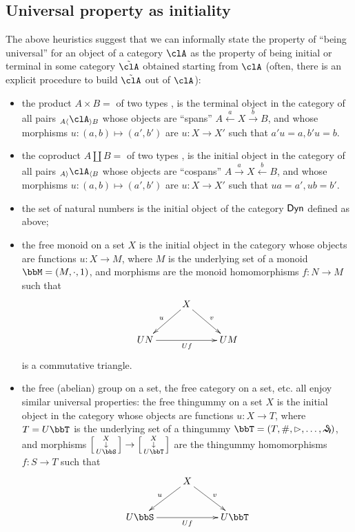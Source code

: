 \documentclass[11pt]{article}
\begin{document}
\subsection{Universal property as initiality}
The above heuristics suggest that we can informally state the property of ``being universal'' for an object of a category \(\clA\) as the property of being initial or terminal in some category $\tilde{\clA}$ obtained starting from $\clA$ (often, there is an explicit procedure to build $\tilde{\clA}$ out of $\clA$):
\begin{itemize}
	\item the product \(A\times B=\)  of two types ,  is the terminal object in the category of all pairs $_{A\langle}\clA_{\rangle B}$ whose objects are ``spans'' $A \overset{a}\leftarrow X \overset{b}\to B$, and whose morphisms $u : (a,b)\mapsto (a',b')$ are $u : X \to X'$ such that $a'u=a, b'u=b$.
	\item the coproduct \(A\coprod B=\)  of two types ,  is the initial object in the category of all pairs $_{A\rangle}\clA_{\langle B}$ whose objects are ``cospans'' $A \overset{a}\to X \overset{b}\leftarrow B$, and whose morphisms $u : (a,b)\mapsto (a',b')$ are $u : X \to X'$ such that $ua = a', ub=b'$.
	\item the set of natural numbers is the initial object of the category \(\sf Dyn\) defined as above;
	\item the free monoid on a set $X$ is the initial object in the category whose objects are functions $u : X\to M$, where $M$ is the underlying set of a monoid $\bbM = (M,\cdot,1)$, and morphisms are the monoid homomorphisms $f : N\to M$ such that
	\[
		\vcenter{\xymatrix{
			&X\ar[dl]_u\ar[dr]^v & \\
			UN \ar[rr]_{Uf} && UM
		}}
	\]
	is a commutative triangle.
	\item the free (abelian) group on a set, the free category on a set, etc. all enjoy similar universal properties: the free thingummy on a set $X$ is the initial object in the category whose objects are functions $u : X\to T$, where $T=U\bbT$ is the underlying set of a thingummy $\bbT = (T,\#,\rhd,\dots,\text{\Denarius})$, and morphisms $\smat{X\\\downarrow\\U\bbS}\to \smat{X\\\downarrow\\ U\bbT}$ are the thingummy homomorphisms $f : S\to T$ such that
	\[
		\vcenter{\xymatrix{
			&X\ar[dl]_u\ar[dr]^v & \\
			U\bbS \ar[rr]_{Uf} && U\bbT
		}}
	\]
\end{itemize}
\end{document}
